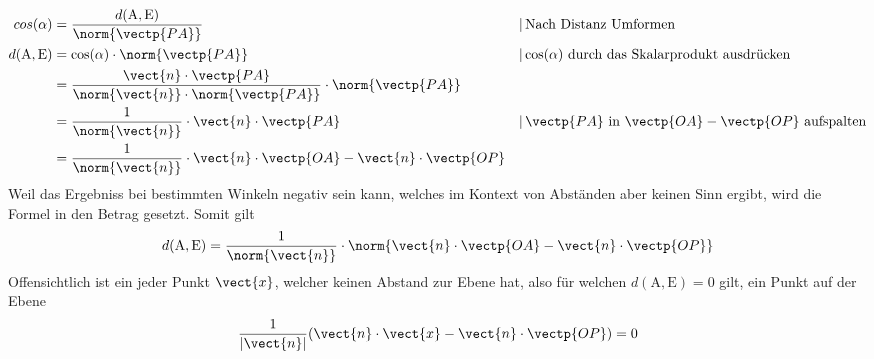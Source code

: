 \documentclass{article}
\begin{document}
\allowdisplaybreaks 
\begin{align*} 
 cos(\alpha) &= \frac{d(\mathrm{A}, \mathrm{E})}{\norm{\vectp{PA}}}
 && \vert\, \text{Nach Distanz Umformen} \\
 d(\mathrm{A}, \mathrm{E}) &= \cos(\alpha) \cdot \norm{\vectp{PA}} 
 && \vert\, \text{$\cos(\alpha)$ durch das Skalarprodukt ausdrücken} \\
 &= \frac{\vect{n} \cdot \vectp{PA}}{\norm{\vect{n}} \cdot \norm{\vectp{PA}}} \cdot \norm{\vectp{PA}} \\
 &= \frac{1}{\norm{\vect{n}}} \cdot \vect{n} \cdot \vectp{PA}
 && \vert\, \text{$\vectp{PA}$ in $\vectp{OA}-\vectp{OP}$ aufspalten} \\
 &= \frac{1}{\norm{\vect{n}}} \cdot \vect{n} \cdot \vectp{OA} - \vect{n} \cdot \vectp{OP}
\end{align*} 
Weil das Ergebniss bei bestimmten Winkeln negativ sein kann, welches im Kontext von Abständen aber keinen Sinn ergibt, wird die Formel in den Betrag gesetzt. Somit gilt
\[
 d(\mathrm{A}, \mathrm{E}) = \frac{1}{\norm{\vect{n}}} \cdot \norm{\vect{n} \cdot \vectp{OA} - \vect{n} \cdot \vectp{OP}} 
\] 
Offensichtlich ist ein jeder Punkt $\vect{x}$, welcher keinen Abstand zur Ebene hat, also für welchen $d(\mathrm{A}, \mathrm{E})=0$ gilt, ein Punkt auf der Ebene  
\[
 \frac{1}{|\vect{n}|} (\vect{n} \cdot \vect{x} - \vect{n} \cdot \vectp{OP}) = 0 
\] 
\end{document}
